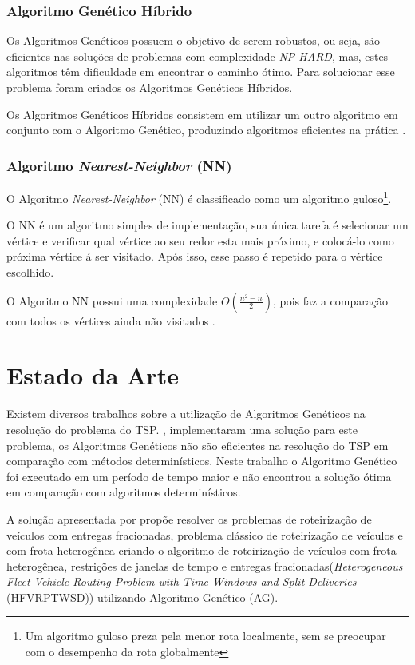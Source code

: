 \documentclass[12pt,openright,a4paper,twoside]{tcc}
\begin{document}
		\subsection{Algoritmo Genético Híbrido}

			Os Algoritmos Genéticos possuem o objetivo de serem robustos, ou seja, são eficientes nas soluções de problemas com complexidade \textit{NP-HARD}, mas, estes algoritmos têm dificuldade em encontrar o caminho ótimo. Para solucionar esse problema foram criados os Algoritmos Genéticos Híbridos.

			Os Algoritmos Genéticos Híbridos consistem em utilizar um outro algoritmo em conjunto com o Algoritmo Genético, produzindo algoritmos eficientes na prática \cite{TravelingTheory}.

        \subsection{Algoritmo \textit{Nearest-Neighbor} (NN)}

            O Algoritmo \textit{Nearest-Neighbor} (NN) é classificado como um algoritmo guloso\footnote{Um algoritmo guloso preza pela menor rota localmente, sem se preocupar com o desempenho da rota globalmente}.

            O NN é um algoritmo simples de implementação, sua única tarefa é selecionar um vértice e verificar qual vértice ao seu redor esta mais próximo, e colocá-lo como próxima vértice á ser visitado. Após isso, esse passo é repetido para o vértice escolhido. 

            O Algoritmo NN possui uma complexidade $O(\frac{n^2-n}{2})$, pois faz a comparação com todos os vértices ainda não visitados \cite{NN}.
			
		\chapter{Estado da Arte}
		
			Existem diversos trabalhos sobre a utilização de Algoritmos Genéticos na resolução do problema do TSP. , implementaram uma solução para este problema, os Algoritmos Genéticos não são eficientes 
			na resolução do TSP em comparação com métodos determinísticos. Neste trabalho o Algoritmo Genético foi executado em um período de tempo maior e não encontrou a solução ótima em comparação com algoritmos determinísticos.

			A solução apresentada por  propõe resolver os problemas de roteirização de 
			veículos com entregas fracionadas, problema clássico de roteirização de veículos e com 
			frota heterogênea criando o algoritmo de roteirização de veículos com frota heterogênea, 
			restrições de janelas de tempo e entregas fracionadas(\textit{Heterogeneous Fleet Vehicle 
			Routing Problem with Time Windows and Split Deliveries} (HFVRPTWSD)) utilizando Algoritmo 
			Genético (AG).
\end{document}

